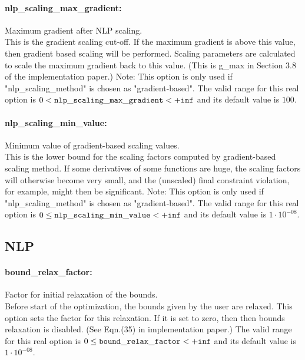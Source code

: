 \paragraph{nlp\_scaling\_max\_gradient:}\label{opt:nlp_scaling_max_gradient} Maximum gradient after NLP scaling. \\
 This is the gradient scaling cut-off. If the maximum gradient is above this value, then gradient based scaling will be performed. Scaling parameters are calculated to scale the maximum gradient back to this value. (This is g\_max in Section 3.8 of the implementation paper.) Note: This option is only used if "nlp\_scaling\_method" is chosen as "gradient-based". The valid range for this real option is 
$0 <  {\tt nlp\_scaling\_max\_gradient } <  {\tt +inf}$
and its default value is $100$.


\paragraph{nlp\_scaling\_min\_value:}\label{opt:nlp_scaling_min_value} Minimum value of gradient-based scaling values. \\
 This is the lower bound for the scaling factors computed by gradient-based scaling method.  If some derivatives of some functions are huge, the scaling factors will otherwise become very small, and the (unscaled) final constraint violation, for example, might then be significant.  Note: This option is only used if "nlp\_scaling\_method" is chosen as "gradient-based". The valid range for this real option is 
$0 \le {\tt nlp\_scaling\_min\_value } <  {\tt +inf}$
and its default value is $1 \cdot 10^{-08}$.


\subsection{NLP}

\paragraph{bound\_relax\_factor:}\label{opt:bound_relax_factor} Factor for initial relaxation of the bounds. \\
 Before start of the optimization, the bounds given by the user are relaxed.  This option sets the factor for this relaxation.  If it is set to zero, then then bounds relaxation is disabled. (See Eqn.(35) in implementation paper.) The valid range for this real option is 
$0 \le {\tt bound\_relax\_factor } <  {\tt +inf}$
and its default value is $1 \cdot 10^{-08}$.


